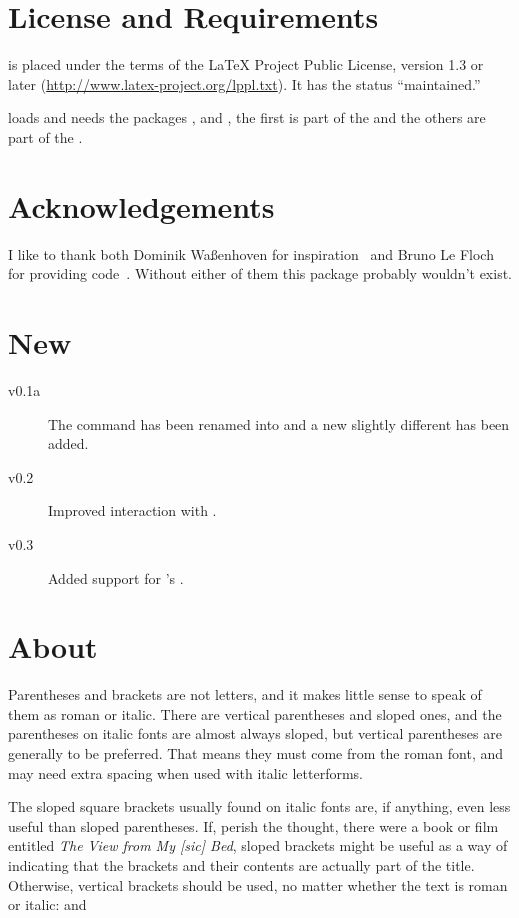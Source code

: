\documentclass[DIV10,toc=index,toc=bib]{cnpkgdoc}
\begin{document}
\section{License and Requirements}
\embrac is placed under the terms of the LaTeX Project Public License,
version 1.3 or later (\url{http://www.latex-project.org/lppl.txt}).
It has the status ``maintained.''

\embrac loads and needs the packages ,  and
, the first is part of the  and the others are
part of the .

\section{Acknowledgements}
I like to thank both Dominik Waßenhoven for inspiration~\cite{dtk12-dw} and
Bruno Le Floch for providing code~\cite{lefloch11}. Without either of them this
package probably wouldn't exist.

\section{New}
\begin{description}
 \item[v0.1a] The command  has been renamed into
    and a new slightly different  has been added.
 \item[v0.2] Improved interaction with .
 \item[v0.3] Added support for 's .
\end{description}

\section{About}\label{sec:about}
\begin{zitat}
  Parentheses and brackets are not letters, and it makes little sense to speak
  of them as roman or italic.  There are vertical parentheses and sloped ones,
  and the parentheses on italic fonts are almost always sloped, but vertical
  parentheses are generally to be preferred.  That means they must come from
  the roman font, and may need extra spacing when used with italic
  letterforms.
 
  The sloped square brackets usually found on italic fonts are, if anything,
  even less useful than sloped parentheses.  If, perish the thought, there
  were a book or film entitled \emph*{The View from My [sic] Bed}, sloped
  brackets might be useful as a way of indicating that the brackets and their
  contents are actually part of the title.  Otherwise, vertical brackets
  should be used, no matter whether the text is roman or italic:
   and 
\end{zitat}
\end{document}
